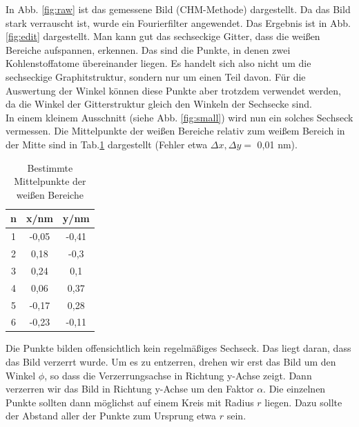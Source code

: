 In Abb. \ref{fig:raw} ist das gemessene Bild (CHM-Methode) dargestellt. Da das Bild stark verrauscht ist, wurde ein Fourierfilter angewendet. Das Ergebnis ist in Abb. \ref{fig:edit} dargestellt. Man kann gut das sechseckige Gitter, dass die weißen Bereiche aufspannen, erkennen. Das sind die Punkte, in denen zwei Kohlenstoffatome übereinander liegen. Es handelt sich also nicht um die sechseckige Graphitstruktur, sondern nur um einen Teil davon. Für die Auswertung der Winkel können diese Punkte aber trotzdem verwendet werden, da die Winkel der Gitterstruktur gleich den Winkeln der Sechsecke sind.\\

In einem kleinem Ausschnitt (siehe Abb. \ref{fig:small}) wird nun ein solches Sechseck vermessen. Die Mittelpunkte der weißen Bereiche relativ zum weißem Bereich in der Mitte sind in Tab.\ref{tab:points} dargestellt (Fehler etwa $\Delta x,\Delta y=$ 0,01 nm).

\begin{table}
\centering
\caption{Bestimmte Mittelpunkte der weißen Bereiche}
\begin{tabular}{ccc}
\toprule
n & x/nm & y/nm\\
\midrule
1 & -0,05 &-0,41\\
2 & 0,18&	-0,3\\
3 & 0,24&	0,1\\
4 & 0,06&	0,37\\
5 & -0,17&	0,28\\
6 & -0,23&	-0,11\\
\bottomrule
\end{tabular}
\label{tab:points}
\end{table}
 
Die Punkte bilden offensichtlich kein regelmäßiges Sechseck. Das liegt daran, dass das Bild verzerrt wurde. Um es zu entzerren, drehen wir erst das Bild um den Winkel $\phi$, so dass die Verzerrungsachse in Richtung y-Achse zeigt. Dann verzerren wir das Bild in Richtung y-Achse um den Faktor $\alpha$. Die einzelnen Punkte sollten dann möglichst auf einem Kreis mit Radius $r$ liegen. Dazu sollte der Abstand aller der Punkte zum Ursprung etwa $r$ sein.\\

